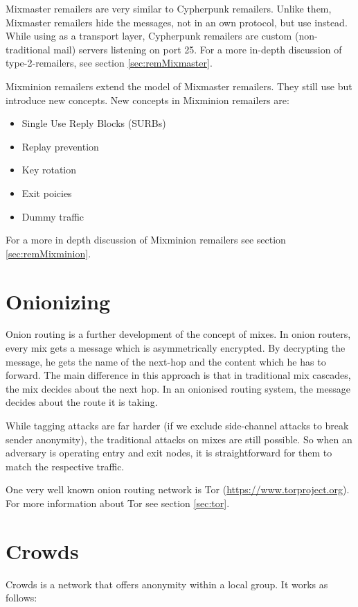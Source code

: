 Mixmaster remailers are very similar to Cypherpunk remailers. Unlike them, Mixmaster remailers hide the messages, not in an own protocol, but use  instead. While using  as a transport layer, Cypherpunk remailers are custom (non-traditional mail) servers listening on port 25. For a more in-depth discussion of type-2-remailers, see section \ref{sec:remMixmaster}.

Mixminion remailers extend the model of Mixmaster remailers. They still use  but introduce new concepts. New concepts in Mixminion remailers are:
\begin{itemize}
	\item Single Use Reply Blocks (SURBs)
	\item Replay prevention
	\item Key rotation
	\item Exit poicies
	\item Dummy traffic
\end{itemize}
For a more in depth discussion of Mixminion remailers see section \ref{sec:remMixminion}.


\section{Onionizing}
Onion routing is a further development of the concept of mixes. In onion routers, every mix gets a message which is asymmetrically encrypted. By decrypting the message, he gets the name of the next-hop and the content which he has to forward. The main difference in this approach is that in traditional mix cascades, the mix decides about the next hop. In an onionised routing system, the message decides about the route it is taking. 

While tagging attacks are far harder (if we exclude side-channel attacks to break sender anonymity), the traditional attacks on mixes are still possible. So when an adversary is operating entry and exit nodes, it is straightforward for them to match the respective traffic.

One very well known onion routing network is Tor (\href{https://www.torproject.org}{https://www.torproject.org}). For more information about Tor see section \ref{sec:tor}.

\section{Crowds}
Crowds is a network that offers anonymity within a local group. It works as follows:

